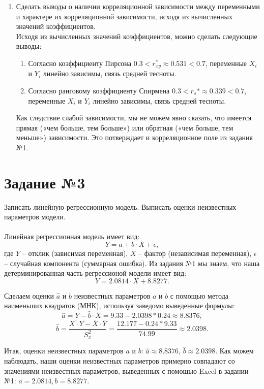\documentclass[12pt, letterpaper, twoside]{article}
\begin{document}
\begin{enumerate}
	\item Сделать выводы о наличии корреляционной зависимости между переменными и характере их корреляционной зависимости, исходя из вычисленных значений коэффициентов.\\
	Исходя из вычисленных значений коэффициентов, можно сделать следующие выводы:
	\begin{enumerate}
		\item Согласно коэффициенту Пирсона $0.3 <r_{xy}^* \approx 0.531 < 0.7$, переменные $X_i$ и $Y_i$ линейно зависимы, связь средней тесноты.
		\item Согласно ранговому коэффициенту Спирмена $0.3 <r_s* \approx 0.339 < 0.7$, переменные $X_i$ и $Y_i$ линейно зависимы, связь средней тесноты.
	\end{enumerate}
	Как следствие слабой зависимости, мы не можем явно сказать, что имеется прямая («чем больше, тем больше») или обратная («чем больше, тем меньше») зависимости. Это потверждает и корреляционное поле из задания №1.
	\end{enumerate}

\section{Задание №3}
Записать линейную регрессионную модель. Выписать оценки неизвестных параметров модели.\\ \\

Линейная регрессионная модель имеет вид: $$Y = a + b \cdot X + \epsilon, $$ где $Y$ -- отклик (зависимая переменная), $X$ -- фактор (независимая переменная), $\epsilon$ -- случайная компонента (суммарная ошибка). Из задания №1 мы знаем, что наша детерминированная часть регрессионой модели имеет вид: $$Y = 2.0814 \cdot X + 8.8277.$$

Сделаем оценки $\hat{a}$ и $\hat{b}$ неизвестных параметров $a$ и $b$ с помощью метода наименьших квадратов (МНК), используя заведомо выведенные формулы:
$$\hat{a} = \overline{Y} - \hat{b} \cdot \overline{X} = 9.33 - 2.0398*0.24 \approx 8.8376,$$
$$\hat{b} = \frac{\overline{X \cdot Y} - \overline{X} \cdot \overline{Y}}{S_x^2} = \frac{12.177-0.24*9.33}{74.99} \approx 2.0398.$$

Итак, оценки неизвестных параметров $a$ и $b$: $\hat{a} \approx 8.8376$, $\hat{b} \approx 2.0398$. Как можем наблюдать, наши оценки неизвестных параметров примерно совпадают со значениями неизвестных параметров, выведенных с помощью Excel в задании №1: $a = 2.0814, b = 8.8277$.
\end{document}
